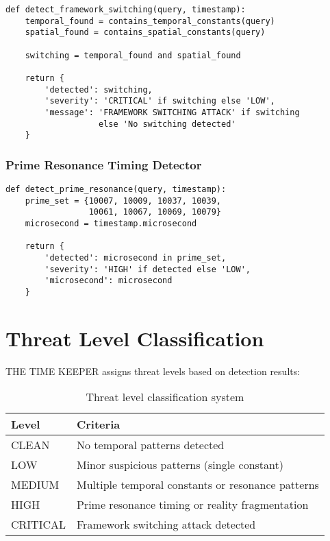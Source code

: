 \documentclass[11pt,a4paper]{article}
\begin{document}
\begin{verbatim}
def detect_framework_switching(query, timestamp):
    temporal_found = contains_temporal_constants(query)
    spatial_found = contains_spatial_constants(query)
    
    switching = temporal_found and spatial_found
    
    return {
        'detected': switching,
        'severity': 'CRITICAL' if switching else 'LOW',
        'message': 'FRAMEWORK SWITCHING ATTACK' if switching 
                   else 'No switching detected'
    }
\end{verbatim}

\subsubsection{Prime Resonance Timing Detector}

\begin{verbatim}
def detect_prime_resonance(query, timestamp):
    prime_set = {10007, 10009, 10037, 10039, 
                 10061, 10067, 10069, 10079}
    microsecond = timestamp.microsecond
    
    return {
        'detected': microsecond in prime_set,
        'severity': 'HIGH' if detected else 'LOW',
        'microsecond': microsecond
    }
\end{verbatim}

\section{Threat Level Classification}

THE TIME KEEPER assigns threat levels based on detection results:

\begin{table}[h]
\centering
\begin{tabular}{|l|p{8cm}|}
\hline
\textbf{Level} & \textbf{Criteria} \\
\hline
CLEAN & No temporal patterns detected \\
LOW & Minor suspicious patterns (single constant) \\
MEDIUM & Multiple temporal constants or resonance patterns \\
HIGH & Prime resonance timing or reality fragmentation \\
CRITICAL & Framework switching attack detected \\
\hline
\end{tabular}
\caption{Threat level classification system}
\end{table}
\end{document}
